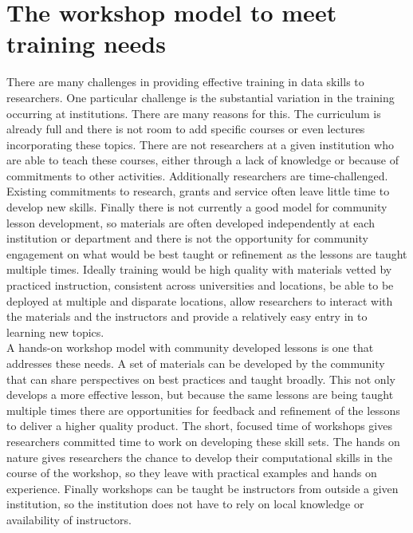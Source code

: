 \documentclass[15]{idcc}
\begin{document}
\section{The workshop model to meet training needs}

There are many challenges in providing effective training in data skills to researchers. One particular challenge is
the substantial variation in the training occurring at institutions. There are many reasons for this. The curriculum
is already full and there is not room to add specific courses or even lectures incorporating these topics. There are
not researchers at a given institution who are able to teach these courses, either through a lack of knowledge
or because of commitments to other activities. Additionally researchers are time-challenged. Existing commitments to research, grants and service often leave little time to develop new skills. Finally
there is not currently a good model for community lesson development, so materials are often developed independently at
each institution or department and there is not the opportunity for community engagement on what would be best taught or
refinement as the lessons are taught multiple times. Ideally training would
be high quality with materials vetted by practiced instruction, consistent across universities and locations, be able
to be deployed at multiple and disparate locations, allow researchers to interact with the materials and the
instructors and provide a relatively easy entry in to learning new topics.\\

A hands-on workshop model with community developed lessons is one that addresses these needs. A set of materials can be developed by the community that can share perspectives on best practices and taught broadly. This not only develops a more effective lesson, but
because the same lessons are being taught multiple times there are opportunities for feedback and refinement of the lessons to deliver a higher quality product. The short, focused time of workshops gives researchers committed time to work on developing these skill
sets. The hands on nature gives researchers the chance to develop their computational skills in the course of the workshop, so they
leave with practical examples and hands on experience. Finally workshops can be taught be instructors from outside a given institution, so the institution does not have to rely on local knowledge or availability of instructors.\\
\end{document}
